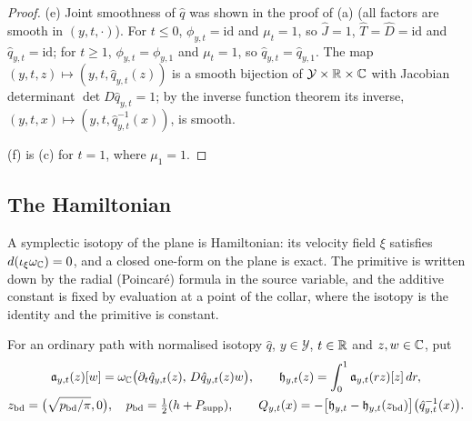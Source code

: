 \begin{proof}
(e) Joint smoothness of $\hat q$ was shown in the proof of (a) (all factors are smooth in $(y,t,\cdot)$). For $t\le0$,
$\phi_{y,t}=\mathrm{id}$ and $\mu_t=1$, so $\hat J=1$, $\hat T=\hat D=\mathrm{id}$ and $\hat q_{y,t}=\mathrm{id}$; for $t\ge1$, $\phi_{y,t}=\phi_{y,1}$ and
$\mu_t=1$, so $\hat q_{y,t}=\hat q_{y,1}$. The map $(y,t,z)\mapsto(y,t,\hat q_{y,t}(z))$ is a smooth bijection of
$\mathcal Y\times\mathbb{R}\times\mathbb{C}$ with Jacobian determinant $\det D\hat q_{y,t}=1$; by the inverse function theorem its inverse,
$(y,t,x)\mapsto(y,t,\hat q_{y,t}^{-1}(x))$, is smooth.

(f) is (c) for $t=1$, where $\mu_1=1$.
\end{proof}

\subsection{The Hamiltonian}\label{sec:pln-ham}

A symplectic isotopy of the plane is Hamiltonian: its velocity field $\xi$ satisfies $d(\iota_\xi\omega_{\mathbb{C}})=0$, and a closed
one-form on the plane is exact. The primitive is written down by the radial (Poincar\'e) formula in the source
variable, and the additive constant is fixed by evaluation at a point of the collar, where the isotopy is the identity
and the primitive is constant.

\begin{construction}\label{cons:pln-hamiltonian}
For an ordinary path with normalised isotopy $\hat q$, $y\in\mathcal Y$, $t\in\mathbb{R}$ and $z,w\in\mathbb{C}$, put
\begin{gather*}
 \mathfrak a_{y,t}(z)[w]=\omega_{\mathbb{C}}\bigl(\partial_t\hat q_{y,t}(z),\,D\hat q_{y,t}(z)w\bigr),\qquad
 \mathfrak h_{y,t}(z)=\int_0^1\mathfrak a_{y,t}(rz)[z]\,dr,\\
 z_{\rm bd}=\bigl(\sqrt{p_{\rm bd}/\pi},0\bigr),\quad p_{\rm bd}=\tfrac12(h+P_{\rm supp}),\qquad
 Q_{y,t}(x)=-\bigl[\mathfrak h_{y,t}-\mathfrak h_{y,t}(z_{\rm bd})\bigr]\bigl(\hat q_{y,t}^{-1}(x)\bigr).
\end{gather*}
\end{construction}

